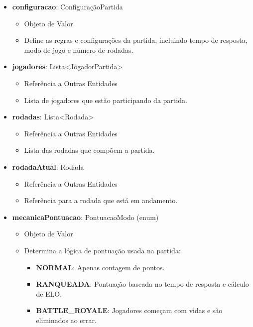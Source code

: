 \begin{itemize}
        \item \textbf{configuracao}: ConfiguraçãoPartida  
            \begin{itemize}
                \item Objeto de Valor
                \item Define as regras e configurações da partida, incluindo tempo de resposta, modo de jogo e número de rodadas.
            \end{itemize}

        \item \textbf{jogadores}: Lista\textless JogadorPartida\textgreater  
            \begin{itemize}
                \item Referência a Outras Entidades
                \item Lista de jogadores que estão participando da partida.
            \end{itemize}

        \item \textbf{rodadas}: Lista\textless Rodada\textgreater  
            \begin{itemize}
                \item Referência a Outras Entidades
                \item Lista das rodadas que compõem a partida.
            \end{itemize}

        \item \textbf{rodadaAtual}: Rodada  
            \begin{itemize}
                \item Referência a Outras Entidades
                \item Referência para a rodada que está em andamento.
            \end{itemize}

        \item \textbf{mecanicaPontuacao}: PontuacaoModo (enum)  
            \begin{itemize}
                \item Objeto de Valor
                \item Determina a lógica de pontuação usada na partida:
                \begin{itemize}
                    \item \textbf{NORMAL}: Apenas contagem de pontos.
                    \item \textbf{RANQUEADA}: Pontuação baseada no tempo de resposta e cálculo de ELO.
                    \item \textbf{BATTLE\_ROYALE}: Jogadores começam com vidas e são eliminados ao errar.
                \end{itemize}
            \end{itemize}


\end{itemize}
